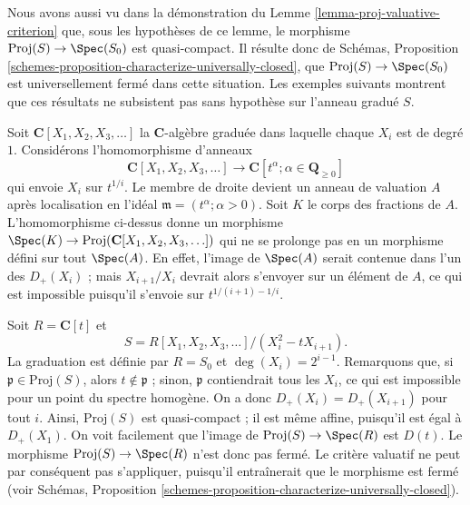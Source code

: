 \noindent
Nous avons aussi vu dans la démonstration du
Lemme \ref{lemma-proj-valuative-criterion} que, sous les hypothèses de ce
lemme, le morphisme $\text{Proj}(S) \to \Spec(S_0)$ est quasi-compact. Il résulte donc de Schémas,
Proposition \ref{schemes-proposition-characterize-universally-closed}, que
$\text{Proj}(S) \to \Spec(S_0)$ est universellement fermé dans cette
situation. Les exemples suivants montrent que ces résultats ne subsistent
pas sans hypothèse sur l'anneau gradué $S$.

\begin{example}
\label{example-not-existence-valuative-big-proj}
Soit $\mathbf{C}[X_1, X_2, X_3, \ldots]$ la $\mathbf{C}$-algèbre graduée dans
laquelle chaque $X_i$ est de degré $1$. Considérons l'homomorphisme d'anneaux
$$
\mathbf{C}[X_1, X_2, X_3, \ldots]
\longrightarrow
\mathbf{C}[t^\alpha ; \alpha \in \mathbf{Q}_{\geq 0}]
$$
qui envoie $X_i$ sur $t^{1/i}$. Le membre de droite devient un anneau de
valuation $A$ après localisation en l'idéal
$\mathfrak m = (t^\alpha ; \alpha > 0)$. Soit $K$ le corps des fractions de
$A$. L'homomorphisme ci-dessus donne un morphisme
$\Spec(K) \to \text{Proj}(\mathbf{C}[X_1, X_2, X_3, \ldots])$ qui ne se
prolonge pas en un morphisme défini sur tout $\Spec(A)$. En effet, l'image de
$\Spec(A)$ serait contenue dans l'un des $D_{+}(X_i)$ ; mais
$X_{i + 1}/X_i$ devrait alors s'envoyer sur un élément de $A$, ce qui est
impossible puisqu'il s'envoie sur $t^{1/(i + 1) - 1/i}$.
\end{example}

\begin{example}
\label{example-not-existence-valuative-small-proj}
Soit $R = \mathbf{C}[t]$ et
$$
S = R[X_1, X_2, X_3, \ldots]/(X_i^2 - tX_{i + 1}).
$$
La graduation est définie par $R = S_0$ et
$\deg(X_i) = 2^{i - 1}$. Remarquons que, si
$\mathfrak p \in \text{Proj}(S)$, alors $t \not \in \mathfrak p$ ; sinon,
$\mathfrak p$ contiendrait tous les $X_i$,
ce qui est impossible pour un point
du spectre homogène. On a donc
$D_{+}(X_i) = D_{+}(X_{i + 1})$ pour tout $i$. Ainsi,
$\text{Proj}(S)$ est quasi-compact ; il est même affine, puisqu'il est égal à
$D_{+}(X_1)$. On voit facilement que l'image de
$\text{Proj}(S) \to \Spec(R)$ est $D(t)$. Le morphisme
$\text{Proj}(S) \to \Spec(R)$ n'est donc pas fermé.
Le critère valuatif ne peut par conséquent pas s'appliquer, puisqu'il
entraînerait que le morphisme est fermé (voir Schémas,
Proposition \ref{schemes-proposition-characterize-universally-closed}).
\end{example}

